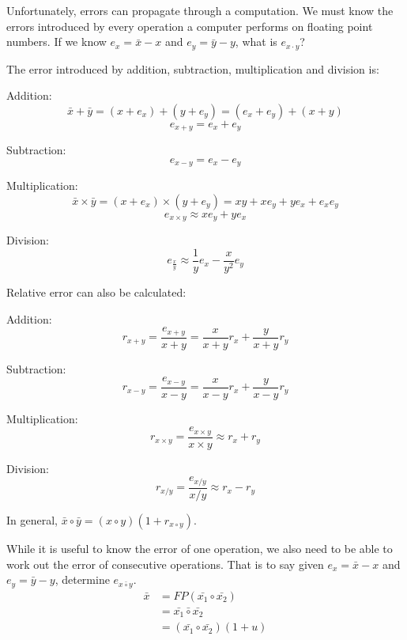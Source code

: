 Unfortunately, errors can propagate through a computation. We must know the
errors introduced by every operation a computer performs on floating point
numbers. If we know $e_x = \bar{x} - x$ and $e_y = \bar{y} - y$, what is $e_{x
\cdot y}$?

The error introduced by addition, subtraction, multiplication and division is:

\begin{description}
  \item Addition:
  \[
    \bar{x} + \bar{y} = (x + e_x) + (y + e_y) = (e_x + e_y) + (x + y)
  \]
  \[
    e_{x+y} = e_x + e_y
  \]
  \item Subtraction:
  \[
    e_{x-y} = e_x - e_y
  \]
  \item Multiplication:
  \[
    \bar{x} \times \bar{y} = (x + e_x) \times (y + e_y) =
      xy + xe_y + ye_x + e_xe_y
  \]
  \[
    e_{x \times y} \approx xe_y + ye_x
  \]
  \item Division:
  \[
    e_\frac{x}{y} \approx \frac{1}{y}e_x - \frac{x}{y^2}e_y
  \]
\end{description}

Relative error can also be calculated:

\begin{description}
  \item Addition:
    \[
      r_{x+y} = \frac{e_{x+y}}{x + y} = \frac{x}{x + y}r_x + \frac{y}{x + y}r_y
    \]
  \item Subtraction:
    \[
      r_{x-y} = \frac{e_{x-y}}{x - y} = \frac{x}{x - y}r_x + \frac{y}{x - y}r_y
    \]
  \item Multiplication:
    \[
      r_{x \times y} = \frac{e_{x \times y}}{x \times y} \approx r_x + r_y
    \]
  \item Division:
    \[
      r_{x / y} = \frac{e_{x / y}}{x / y} \approx r_x - r_y
    \]
\end{description}

In general, $\bar{x} \circ \bar{y} = (x \circ y)(1 + r_{x \circ y})$.


While it is useful to know the error of one operation, we also need to be able
to work out the error of consecutive operations. That is to say given $e_x =
\bar{x} - x$ and  $e_y = \bar{y} - y$, determine $e_{x \bar{\circ} y}$.
\[
  \begin{split}
  \bar{x} &= FP(\bar{x_1} \circ \bar{x_2})\\
          &= \bar{x_1} \bar{\circ} \bar{x_2}\\
          &= (\bar{x_1} \circ \bar{x_2})(1 + u)\\
  \end{split}
\]

